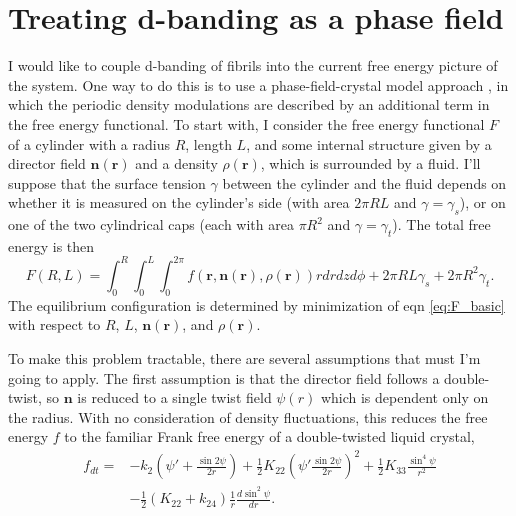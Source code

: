 \documentclass[12pt]{article}
\begin{document}


\section{Treating d-banding as a phase field}
I would like to couple d-banding of fibrils into the current free energy picture of the system. One way to do this is to use a phase-field-crystal model approach \cite{Elder:2004ct}, in which the periodic density modulations are described by an additional term in the free energy functional. To start with, I consider the free energy functional $F$ of a cylinder with a radius $R$, length $L$, and some internal structure given by a director field $\bm{n}(\bm{r})$ and a density $\rho(\bm{r})$, which is surrounded by a fluid. I'll suppose that the surface tension $\gamma$ between the cylinder and the fluid depends on whether it is measured on the cylinder's side (with area $2\pi R L$ and $\gamma=\gamma_s$), or on one of the two cylindrical caps (each with area $\pi R^2$ and $\gamma=\gamma_t$). The total free energy is then
\begin{equation}\label{eq:F_basic}
F(R,L)=\int_0^R\int_0^L\int_0^{2\pi}f(\bm{r},\bm{n}(\bm{r}),\rho(\bm{r}))rdrdzd\phi+2\pi RL\gamma_s+2\pi R^2\gamma_t.
\end{equation}
The equilibrium configuration is determined by minimization of eqn \ref{eq:F_basic} with respect to $R$, $L$, $\bm{n}(\bm{r})$, and $\rho(\bm{r})$.

To make this problem tractable, there are several assumptions that must I'm going to apply. The first assumption is that the director field follows a double-twist, so $\bm{n}$ is reduced to a single twist field $\psi(r)$ which is dependent only on the radius. With no consideration of density fluctuations, this reduces the free energy $f$ to the familiar Frank free energy of a double-twisted liquid crystal,
\begin{align}\label{eq:frank}
f_{dt}=&-k_2\left(\psi'+\frac{\sin2\psi}{2r}\right)+\frac{1}{2}K_{22}\left(\psi'\frac{\sin2\psi}{2r}\right)^2+\frac{1}{2}K_{33}\frac{\sin^4\psi}{r^2}\nonumber\\
&-\frac{1}{2}\left(K_{22}+k_{24}\right)\frac{1}{r}\frac{d\sin^2\psi}{dr}.
\end{align}
\end{document}
